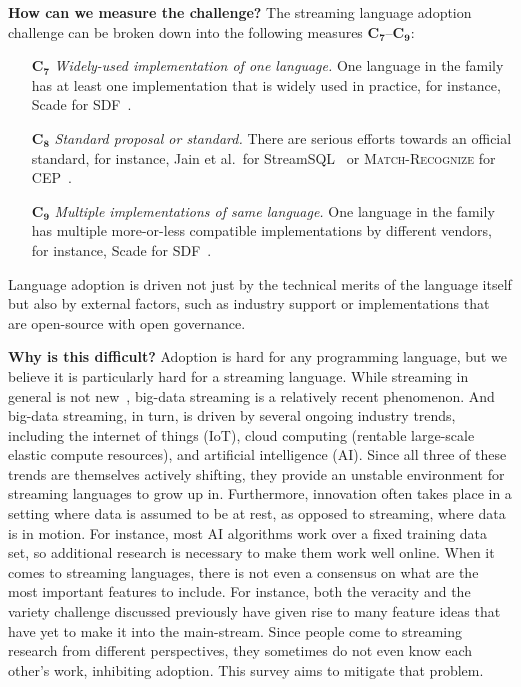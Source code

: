 \textbf{How can we measure the challenge?}
The streaming language  adoption challenge can be broken down
into the following measures $\mathbf{C_7}$--$\mathbf{C_9}$:

\begin{itemize}
  \item[$\mathbf{C_7}$] \emph{Widely-used implementation of one
    language.}  One language in the family has at least one
    implementation that is widely used in practice, for instance,
    Scade for SDF~\cite{scade_2017}.
  \item[$\mathbf{C_8}$] \emph{Standard proposal or standard.}  There
    are serious efforts towards an official standard, for instance,
    Jain et al.\ for StreamSQL~\cite{jain_et_al_2008} or
    \textsc{Match-Recognize} for CEP~\cite{zemke_et_al_2007}.
  \item[$\mathbf{C_9}$] \emph{Multiple implementations of same
    language.}  One language in the family has multiple more-or-less
    compatible implementations by different vendors, for instance,
    Scade for SDF~\cite{scade_2017}.
\end{itemize}

Language adoption is driven not just by the technical merits of the
language itself but also by external factors, such as industry support
or implementations that are open-source with open governance.

\textbf{Why is this difficult?}
Adoption is hard for any programming language, but we believe it is
particularly hard for a streaming language. While streaming in general
is not new~\cite{stephens_1997}, big-data streaming is a relatively
recent phenomenon. And big-data streaming, in turn, is driven by
several ongoing industry trends, including the internet of things
(IoT), cloud computing (rentable large-scale elastic compute
resources), and artificial intelligence (AI). Since all three of these
trends are themselves actively shifting, they provide an unstable
environment for streaming languages to grow up in. Furthermore,
innovation often takes place in a setting where data is assumed to be
at rest, as opposed to streaming, where data is in motion. For
instance, most AI algorithms work over a fixed training data set, so
additional research is necessary to make them work well online.  When
it comes to streaming languages, there is not even a consensus on what
are the most important features to include. For instance, both the
veracity and the variety challenge discussed previously have given
rise to many feature ideas that have yet to make it into the
main-stream.  Since people come to streaming research from different
perspectives, they sometimes do not even know each other's work,
inhibiting adoption. This survey aims to mitigate that problem.
